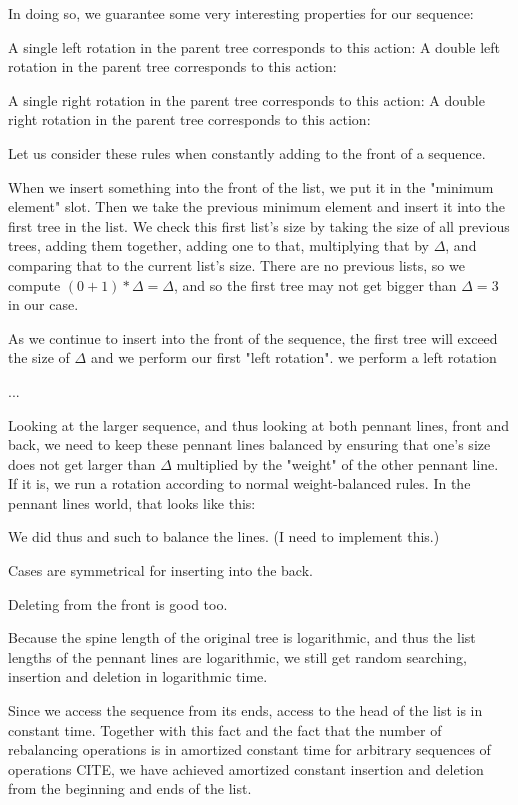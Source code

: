 \documentclass[sigconf]{acmart}
\begin{document}
In doing so, we guarantee some very interesting properties for our sequence:

A single left rotation in the parent tree corresponds to this action:
A double left rotation in the parent tree corresponds to this action:

A single right rotation in the parent tree corresponds to this action:
A double right rotation in the parent tree corresponds to this action:

Let us consider these rules when constantly adding to the front of a sequence.

When we insert something into the front of the list, we put it in the "minimum
element" slot. Then we take the previous minimum element and insert it into the
first tree in the list. We check this first list's size by taking the size of
all previous trees, adding them together, adding one to that, multiplying that
by $\Delta$, and comparing that to the current list's size. There are no
previous lists, so we compute $(0+1)*\Delta = \Delta$, and so the first tree may
not get bigger than $\Delta = 3$ in our case.

As we continue to insert into the front of the sequence, the first tree will
exceed the size of $\Delta$ and we perform our first "left rotation". we perform a left
rotation

...

Looking at the larger sequence, and thus looking at both pennant lines, front
and back, we need to keep these pennant lines balanced by ensuring that one's
size does not get larger than $\Delta$ multiplied by the "weight" of the other
pennant line. If it is, we run a rotation according to normal weight-balanced
rules. In the pennant lines world, that looks like this:


We did thus and such to balance the lines. (I need to implement this.)

Cases are symmetrical for inserting into the back.

Deleting from the front is good too.

Because the spine length of the original tree is logarithmic, and thus the list
lengths of the pennant lines are logarithmic, we still get random searching,
insertion and deletion in logarithmic time.

Since we access the sequence from its ends, access to the head of the list is
in constant time. Together with this fact and the fact that the number of
rebalancing operations is in amortized constant time for arbitrary sequences of
operations CITE, we have achieved amortized constant insertion and deletion from
the beginning and ends of the list.
\end{document}
